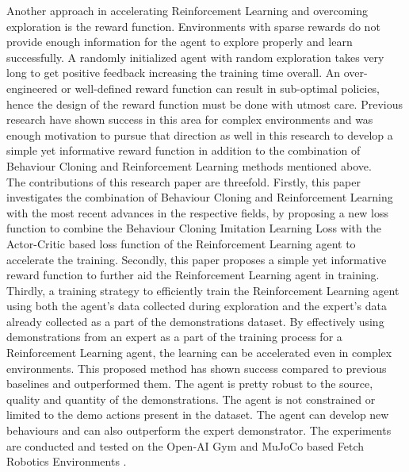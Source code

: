Another approach in accelerating Reinforcement Learning and overcoming exploration is the reward function. Environments with sparse rewards do not provide enough information for the agent to explore properly and learn successfully. A randomly initialized agent with random exploration takes very long to get positive feedback increasing the training time overall. An over-engineered or well-defined reward function can result in sub-optimal policies, hence the design of the reward function must be done with utmost care. Previous research \cite{nagpal2020reward} \cite{Dewey2014ReinforcementLA} \cite{Konidaris2006AutonomousSK} have shown success in this area for complex environments and was enough motivation to pursue that direction as well in this research to develop a simple yet informative reward function in addition to the combination of Behaviour Cloning and Reinforcement Learning methods mentioned above. \\

The contributions of this research paper are threefold. Firstly, this paper investigates the combination of Behaviour Cloning and Reinforcement Learning with the most recent advances in the respective fields, by proposing a new loss function to combine the Behaviour Cloning Imitation Learning Loss \cite{goecks2020integrating} \cite{nair2018overcoming} with the Actor-Critic based loss function \cite{lillicrap2019continuous} \cite{fujimoto2018addressing} of the Reinforcement Learning agent to accelerate the training. Secondly, this paper proposes a simple yet informative reward function to further aid the Reinforcement Learning agent in training. Thirdly, a training strategy to efficiently train the Reinforcement Learning agent using both the agent's data collected during exploration and the expert's data already collected as a part of the demonstrations dataset. By effectively using demonstrations from an expert as a part of the training process for a Reinforcement Learning agent, the learning can be accelerated even in complex environments. This proposed method has shown success compared to previous baselines and outperformed them. The agent is pretty robust to the source, quality and quantity of the demonstrations. The agent is not constrained or limited to the demo actions present in the dataset. The agent can develop new behaviours and can also outperform the expert demonstrator. The experiments are conducted and tested on the Open-AI Gym \cite{brockman2016openai} and MuJoCo \cite{MJC} based Fetch Robotics Environments \cite{plappert2018multigoal}. \\

